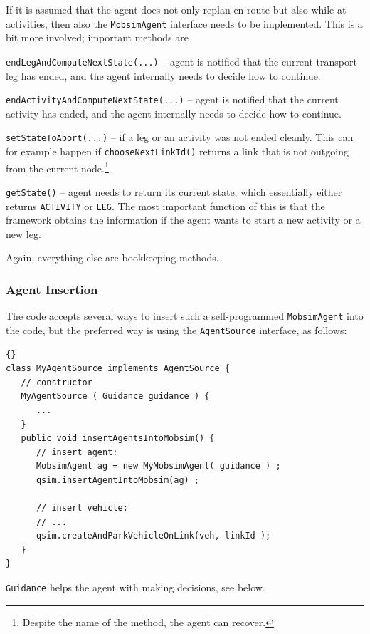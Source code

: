 If it is assumed that the agent does not only replan en-route but also while at activities, then also the \lstinline$MobsimAgent$ interface needs to be implemented.  This is a bit more involved; important methods are
\begin{compactitem}
\item \lstinline$endLegAndComputeNextState(...)$ -- agent is notified that the current transport leg has ended, and the agent internally needs to decide how to continue.
\item \lstinline$endActivityAndComputeNextState(...)$ -- agent is notified that the current activity has ended, and the agent internally needs to decide how to continue.
\item \lstinline$setStateToAbort(...)$ -- if a leg or an activity was not ended cleanly.  This can for example happen if \lstinline$chooseNextLinkId()$ returns a link that is not outgoing from the current node.\footnote{%
%
Despite the name of the method, the agent can recover.  %
}
\item \lstinline$getState()$ -- agent needs to return its current state, which essentially either returns \lstinline$ACTIVITY$ or \lstinline$LEG$.  The most important function of this is that the framework obtains the information if the agent wants to start a new activity or a new leg.
\end{compactitem}
Again, everything else are bookkeeping methods.

\subsubsection{Agent Insertion}
The code accepts several ways to insert such a self-programmed \lstinline$MobsimAgent$ into the code, but the preferred way is using the \lstinline$AgentSource$ interface, as follows:
\begin{lstlisting}[basicstyle=\footnotesize\tt]{}
class MyAgentSource implements AgentSource {
   // constructor
   MyAgentSource ( Guidance guidance ) {
      ...
   }
   public void insertAgentsIntoMobsim() {
      // insert agent:
      MobsimAgent ag = new MyMobsimAgent( guidance ) ;
      qsim.insertAgentIntoMobsim(ag) ;
        
      // insert vehicle:
      // ...
      qsim.createAndParkVehicleOnLink(veh, linkId );
   }
}
\end{lstlisting}
\lstinline$Guidance$ helps the agent with making decisions, see below.

